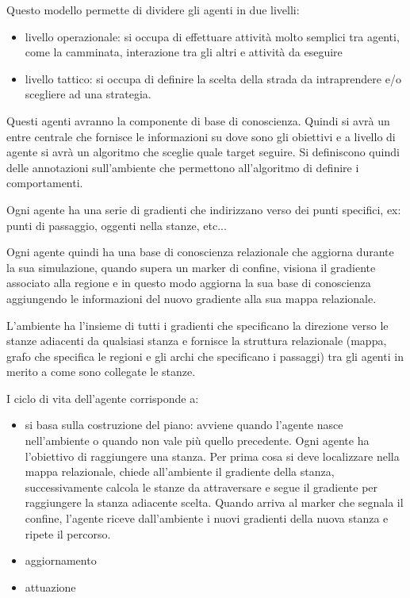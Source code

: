 Questo modello permette di dividere gli agenti in due livelli:
\begin{itemize}
    \item livello operazionale: si occupa di effettuare attività molto semplici 
    tra agenti, come la camminata, interazione tra gli altri e attività da eseguire
    \item livello tattico: si occupa di definire la scelta della strada da intraprendere 
    e/o scegliere ad una strategia.
\end{itemize}

Questi agenti avranno la componente di base di conoscienza. Quindi si avrà un
entre centrale che fornisce le informazioni su dove sono gli obiettivi e a livello
di agente si avrà un algoritmo che sceglie quale target seguire. Si definiscono 
quindi delle annotazioni sull'ambiente che permettono all'algoritmo di definire 
i comportamenti. 

Ogni agente ha una serie di gradienti che indirizzano verso dei punti specifici,
ex: punti di passaggio, oggenti nella stanze, etc...

Ogni agente quindi ha una base di conoscienza relazionale che aggiorna durante la sua simulazione,
quando supera un marker di confine, visiona il gradiente associato alla regione 
e in questo modo aggiorna la sua base di conoscienza aggiungendo le informazioni 
del nuovo gradiente alla sua mappa relazionale.

L'ambiente ha l'insieme di tutti i gradienti che specificano la direzione verso 
le stanze adiacenti da qualsiasi stanza e fornisce la struttura relazionale (mappa,
grafo che specifica le regioni e gli archi che specificano i passaggi) tra 
gli agenti in merito a come sono collegate le stanze.

I ciclo di vita dell'agente corrisponde a:
\begin{itemize}
    \item si basa sulla costruzione del piano: avviene quando l'agente nasce nell'ambiente 
    o quando non vale più quello precedente. Ogni agente  ha l'obiettivo di raggiungere 
    una stanza. Per prima cosa si deve localizzare nella mappa relazionale, chiede 
    all'ambiente il gradiente della stanza, successivamente calcola le stanze da 
    attraversare e segue il gradiente per raggiungere la stanza adiacente scelta.
    Quando arriva al marker che segnala il confine, l'agente riceve dall'ambiente 
    i nuovi gradienti della nuova stanza e ripete il percorso.
    \item aggiornamento
    \item attuazione
\end{itemize}

